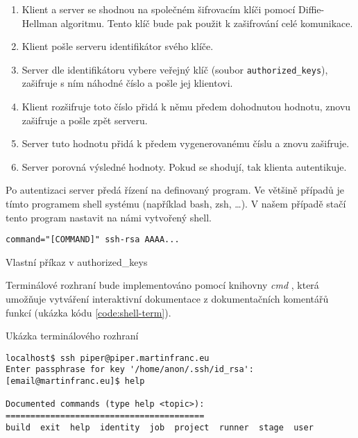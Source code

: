\begin{enumerate}
    \item Klient a server se shodnou na společném šifrovacím klíči pomocí Diffie-Hellman algoritmu.
    Tento klíč bude pak použit k zašifrování celé komunikace.
    \item Klient pošle serveru identifikátor svého klíče.
    \item Server dle identifikátoru vybere veřejný klíč (soubor \verb|authorized_keys|), zašifruje s ním náhodné číslo a pošle jej klientovi.
    \item Klient rozšifruje toto číslo přidá k němu předem dohodnutou hodnotu, znovu zašifruje a pošle zpět serveru.
    \item Server tuto hodnotu přidá k předem vygenerovanému číslu a znovu zašifruje.
    \item Server porovná výsledné hodnoty. Pokud se shodují, tak klienta autentikuje.
\end{enumerate}

Po autentizaci server předá řízení na definovaný program.
Ve většině případů je tímto programem shell systému (například bash, zsh, \ldots).
V našem případě stačí tento program nastavit na námi vytvořený shell.

\begin{listing}[ht]
\begin{verbatim}
command="[COMMAND]" ssh-rsa AAAA...
\end{verbatim}
\caption{Vlastní příkaz v authorized\_keys}
\end{listing}

Terminálové rozhraní bude implementováno pomocí knihovny \textit{cmd} \cite{python_cmd}, která umožňuje vytváření interaktivní dokumentace z dokumentačních komentářů funkcí (ukázka kódu \ref{code:shell-term}).

\begin{listing}[ht]
\caption{\label{code:shell-term}Ukázka terminálového rozhraní}
\begin{verbatim}
localhost$ ssh piper@piper.martinfranc.eu
Enter passphrase for key '/home/anon/.ssh/id_rsa': 
[email@martinfranc.eu]$ help

Documented commands (type help <topic>):
========================================
build  exit  help  identity  job  project  runner  stage  user

\end{verbatim}
\end{listing}

